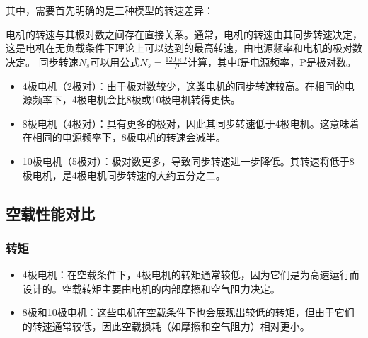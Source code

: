 \documentclass{thuemp}
\begin{document}
其中，需要首先明确的是三种模型的转速差异：

电机的转速与其极对数之间存在直接关系。通常，电机的转速由其同步转速决定，
这是电机在无负载条件下理论上可以达到的最高转速，由电源频率和电机的极对数决定。
同步转速$N_s$可以用公式$N_s=\frac{120\times f}P$计算，其中f是电源频率，P是极对数。
\begin{itemize}
	\item 4极电机（2极对）：由于极对数较少，这类电机的同步转速较高。在相同的电源频率下，4极电机会比8极或10极电机转得更快。
	\item 8极电机（4极对）：具有更多的极对，因此其同步转速低于4极电机。这意味着在相同的电源频率下，8极电机的转速会减半。
	\item 10极电机（5极对）：极对数更多，导致同步转速进一步降低。其转速将低于8极电机，是4极电机同步转速的大约五分之二。
\end{itemize}

\subsection{空载性能对比}
\subsubsection{转矩}
\begin{itemize}
	\item 4极电机：在空载条件下，4极电机的转矩通常较低，因为它们是为高速运行而设计的。空载转矩主要由电机的内部摩擦和空气阻力决定。
	\item 8极和10极电机：这些电机在空载条件下也会展现出较低的转矩，但由于它们的转速通常较低，因此空载损耗（如摩擦和空气阻力）相对更小。
\end{itemize}
\end{document}
